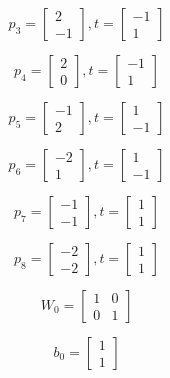 \documentclass{article}
\begin{document}
\[p_3=
\begin{bmatrix}
2\\
-1
\end{bmatrix}
, t = \begin{bmatrix}
-1\\
1
\end{bmatrix}
\]

\[p_4=
\begin{bmatrix}
2\\
0
\end{bmatrix}
, t = \begin{bmatrix}
-1\\
1
\end{bmatrix}
\]

\[p_5=
\begin{bmatrix}
-1\\
2
\end{bmatrix}
, t = \begin{bmatrix}
1\\
-1
\end{bmatrix}
\]

\[p_6=
\begin{bmatrix}
-2\\
1
\end{bmatrix}
, t = \begin{bmatrix}
1\\
-1
\end{bmatrix}
\]

\[p_7=
\begin{bmatrix}
-1\\
-1
\end{bmatrix}
, t = \begin{bmatrix}
1\\
1
\end{bmatrix}
\]

\[p_8=
\begin{bmatrix}
-2\\
-2
\end{bmatrix}
, t = \begin{bmatrix}
1\\
1
\end{bmatrix}
\]

\[W_0=
\begin{bmatrix}
1 & 0\\
0 & 1
\end{bmatrix}
\]

\[b_0=
\begin{bmatrix}
1 \\
 1
\end{bmatrix}
\]
\end{document}
